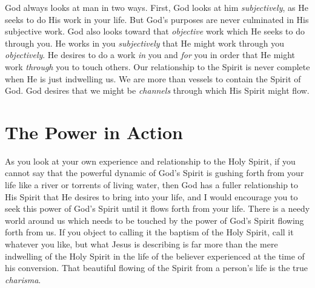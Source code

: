 God always looks at man in two ways. First, God looks at him \emph{subjectively}, as He seeks to do His work in your life. But God's purposes are never culminated in His subjective work. God also looks toward that \emph{objective} work which He seeks to do through you. He works in you \emph{subjectively} that He might work through you \emph{objectively}. He desires to do a work \emph{in} you and \emph{for} you in order that He might work \emph{through} you to touch others. Our relationship to the Spirit is never complete when He is just indwelling us. We are more than vessels to contain the Spirit of God. God desires that we might be \emph{channels} through which His Spirit might flow. 

\section*{The Power in Action}

As you look at your own experience and relationship to the Holy Spirit, if you cannot say that the powerful dynamic of God's Spirit is gushing forth from your life like a river or torrents of living water, then God has a fuller relationship to His Spirit that He desires to bring into your life, and I would encourage you to seek this power of God's Spirit until it flows forth from your life. There is a needy world around us which needs to be touched by the power of God's Spirit flowing forth from us. If you object to calling it the baptism of the Holy Spirit, call it whatever you like, but what Jesus is describing is far more than the mere indwelling of the Holy Spirit in the life of the believer experienced at the time of his conversion. That beautiful flowing of the Spirit from a person's life is the true \emph{charisma}. 



